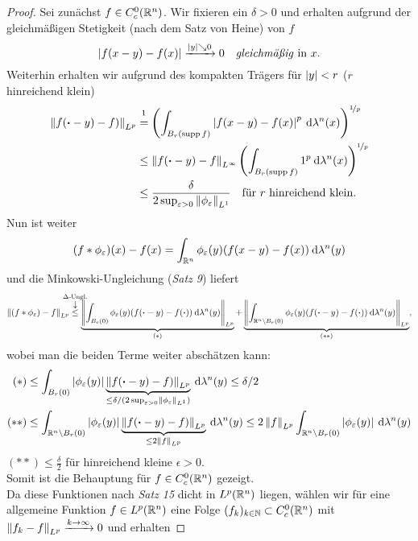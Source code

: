 \documentclass[skript.tex]{subfiles}
\begin{document}
	\begin{proof}
		Sei zunächst $f \in C_c^0(\mathbb{R}^n)$. Wir fixieren ein $\delta>0$ und erhalten aufgrund der gleichmäßigen Stetigkeit (nach dem Satz von Heine) von $f$
		\[
			\left| f(x-y)-f(x) \right| \xrightarrow{\left| y \right|\searrow0} 0\quad\text{\emph{gleichmäßig} in } x.
		\]
		Weiterhin erhalten wir aufgrund des kompakten Trägers für $\left| y \right| < r$ ($r$ hinreichend klein)
		\begin{align*}
			\norm{f(\bcdot-y)-f)}_{L^p} &\overset{\footnotemark}{=}
			 \left(\int_{B_r(\supp f)}\abs{f(x-y)-f(x)}^p \md\lambda^n(x)\right)^{\nicefrac{1}{p}}\\
			&\leq \norm{f(\bcdot-y)-f}_{L^\infty}\left(\int_{B_r(\supp f)}1^p\md\lambda^n(x)\right)^{\nicefrac{1}{p}}\\
			&\leq \frac{\delta}{2\sup_{\epsilon>0}\norm{\phi_\epsilon}_{L^1}}\quad\text{für $r$ hinreichend klein.}
		\end{align*}
		\newpage
		Nun ist weiter
		\[
			(f\ast\phi_\varepsilon)(x)-f(x) = \int_{\mathbb{R}^n} \phi_\varepsilon(y)(f(x-y)-f(x)) \: \mathrm{d}\lambda^n(y)
		\]
		und die Minkowski-Ungleichung (\emph{Satz 9}) liefert
		\[
			\norm{(f\ast\phi_\epsilon)-f}_{L^p} \darrow{\text{$\Delta$-Ungl.}}{\leq} \underbrace{
				\norm{\int_{B_r(0)} \phi_\epsilon(y)(f(\bcdot-y)-f(\bcdot)) \md\lambda^n(y)}_{L^p}
			}_{(\ast)}+\underbrace{
			\norm{\int_{\mbb{R}^n \setminus B_r(0)} \phi_\epsilon(y)(f(\bcdot-y)-f(\bcdot)) \md\lambda^n(y)}_{L^p}
			}_{(\ast\ast)},
		\]
		wobei man die beiden Terme weiter abschätzen kann:
		\begin{align*}
			(\ast) &\leq \int_{B_r(0)}\left| \phi_\varepsilon(y) \right|\underbrace{\left\lVert f(\boldsymbol{\cdot}-y)-f) \right\rVert_{L^p}}_{\leq \delta/(2\sup_{\varepsilon>0}\left\lVert \phi_\varepsilon \right\rVert_{L^1})} \: \mathrm{d}\lambda^n(y) \leq \delta/2 \\
			(\ast\ast) &\leq \int_{\mathbb{R}^n\setminus B_r(0)}\left| \phi_\varepsilon(y) \right|\underbrace{\left\lVert f(\boldsymbol{\cdot}-y)-f) \right\rVert_{L^p}}_{\leq 2\left\lVert f \right\rVert_{L^p}} \: \mathrm{d}\lambda^n(y) \leq 2\left\lVert f \right\rVert_{L^p} \int_{\mathbb{R}^n\setminus B_r(0)}\left| \phi_\varepsilon(y) \right| \: \mathrm{d}\lambda^n(y)
		\end{align*}
		$(\ast\ast)\leq\frac{\delta}{2}$ für hinreichend kleine $\epsilon>0$.\\
		Somit ist die Behauptung für $f \in C_c^0(\mathbb{R}^n)$ gezeigt.\\
		Da diese Funktionen nach \emph{Satz 15} dicht in $L^p(\mathbb{R}^n)$ liegen, wählen wir für eine allgemeine Funktion $f \in L^p(\mathbb{R}^n)$ eine Folge $(f_k)_{k\in\mathbb{N}} \subset C_c^0(\mathbb{R}^n)$ mit $\left\lVert f_k-f \right\rVert_{L^p} \xrightarrow{k\to\infty} 0$ und erhalten

\end{proof}
\end{document}
